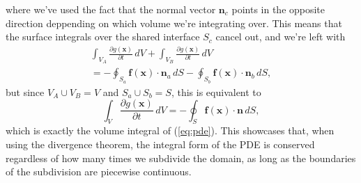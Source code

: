 \documentclass[acmtog]{acmart}
\begin{document}
%
where we've used the fact that the normal vector $\boldsymbol n_c$ points in the opposite direction deppending on which volume we're integrating over. This means that the surface integrals over the shared interface $S_c$ cancel out, and we're left with
%
\begin{multline}
  \int_{V_A} \frac{\partial g(\boldsymbol x)}{\partial t} \, dV + \int_{V_B} \frac{\partial g(\boldsymbol x)}{\partial t} \, dV\\
  = - \oint_{S_a} \boldsymbol f (\boldsymbol x) \cdot \boldsymbol n_a \, dS - \oint_{S_b} \boldsymbol f (\boldsymbol x) \cdot \boldsymbol n_b \, dS,
\end{multline}
%
but since $V_A \cup V_B = V$ and $S_a \cup S_b = S$, this is equivalent to
%
\begin{equation}
  \int_V \frac{\partial g(\boldsymbol x)}{\partial t} \, dV = - \oint_{S} \boldsymbol f (\boldsymbol x) \cdot \boldsymbol n \, dS,
\end{equation}
%
which is exactly the volume integral of (\ref{eq:pde}). This showcases that, when using the divergence theorem, the integral form of the PDE is conserved regardless of how many times we subdivide the domain, as long as the boundaries of the subdivision are piecewise continuous.


\end{document}
